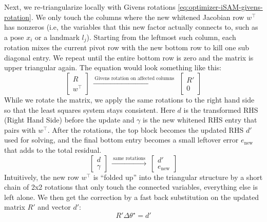 Next, we re-triangularize locally with Givens rotations \eqref{eq:optimizer-iSAM-givens-rotation}. We only touch the columns where the new whitened Jacobian row $w^\top$ has nonzeros (i.e, the variables that this new factor actually connects to, such as a pose $x_i$ or a landmark $l_j$). Starting from the leftmost such column, each rotation mixes the current pivot row with the new bottom row to kill one sub diagonal entry. We repeat until the entire bottom row is zero and the matrix is upper triangular again. The equation would look something like this:
$$
    \begin{bmatrix} R\\ w^\top \end{bmatrix}
    \ \xrightarrow{\ \text{Givens rotation on affected columns}\ }\ 
    \begin{bmatrix} R'\\ 0 \end{bmatrix}
$$
While we rotate the matrix, we apply the same rotations to the right hand side so that the least squares system stays consistent. Here $d$ is the transformed RHS (Right Hand Side) before the update and $\gamma$ is the new whitened RHS entry that pairs with $w^\top$. After the rotations, the top block becomes the updated RHS $d'$ used for solving, and the final bottom entry becomes a small leftover error $e_{\text{new}}$ that adds to the total residual. 
$$
    \begin{bmatrix} d\\ \gamma \end{bmatrix}
    \ \xrightarrow{\ \text{same rotations}\ }\ 
    \begin{bmatrix} d'\\ e_{\text{new}} \end{bmatrix}
$$
Intuitively, the new row $w^\top$ is ``folded up'' into the triangular structure by a short chain of 2x2 rotations that only touch the connected variables, everything else is left alone. We then get the correction by a fast back substitution on the updated matrix $R'$ and vector $d'$:
$$
    R'\Delta\theta^\star = d'
$$



